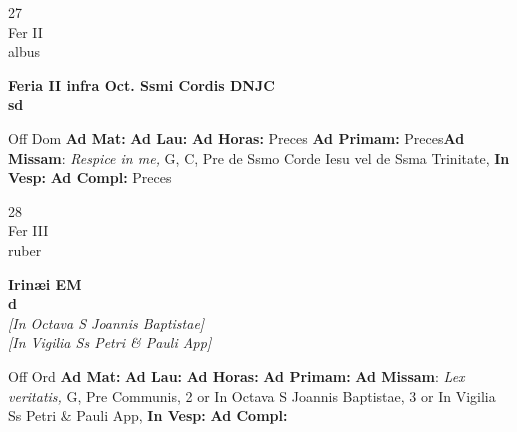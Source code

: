 \documentclass[10pt, openany]{book}
\begin{document}
    \begin{center}
        \begin{minipage}{3.5in}
            \vspace{2em}
            \begin{minipage}{0.5in}
                {\Huge 27} \\
                {\normalsize Fer II} \\
                {\normalsize albus}
            \end{minipage}
            \begin{minipage}{3.0in}
                \textbf{ \large Feria II infra Oct. Ssmi Cordis DNJC \\
                \textnormal{\normalsize sd}} \\ 
            \end{minipage}
            \begin{justify}Off Dom
                \textbf{Ad Mat: }
                \textbf{Ad Lau: }
                \textbf{Ad Horas: }Preces
                \textbf{Ad Primam: }Preces\textbf{Ad Missam}: \textit{Respice in me,} G, C, Pre de Ssmo Corde Iesu vel de Ssma Trinitate,  
                \textbf{In Vesp: }
                \textbf{Ad Compl: }Preces
            \end{justify}
        \end{minipage}
    \end{center}

    \begin{center}
        \begin{minipage}{3.5in}
            \vspace{2em}
            \begin{minipage}{0.5in}
                {\Huge 28} \\
                {\normalsize Fer III} \\
                {\normalsize ruber}
            \end{minipage}
            \begin{minipage}{3.0in}
                \textbf{ \large Irinæi EM \\
                \textnormal{\normalsize d}} \\ \textit{[In Octava S Joannis Baptistae]} \\ \textit{[In Vigilia Ss Petri \& Pauli App]} \\ 
            \end{minipage}
            \begin{justify}Off Ord
                \textbf{Ad Mat: }
                \textbf{Ad Lau: }
                \textbf{Ad Horas: }
                \textbf{Ad Primam: }\textbf{Ad Missam}: \textit{Lex veritatis,} G, Pre Communis, 2 or In Octava S Joannis Baptistae, 3 or In Vigilia Ss Petri \& Pauli App,  
                \textbf{In Vesp: }
                \textbf{Ad Compl: }
            \end{justify}
        \end{minipage}
    \end{center}
\end{document}
